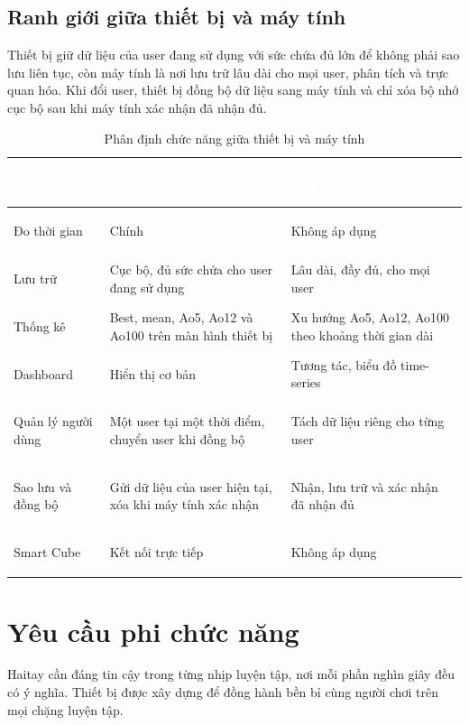 \subsection{Ranh giới giữa thiết bị và máy tính}
Thiết bị giữ dữ liệu của user đang sử dụng với sức chứa đủ lớn để không phải sao lưu liên tục, còn máy tính là nơi lưu trữ lâu dài cho mọi user, phân tích và trực quan hóa. Khi đổi user, thiết bị đồng bộ dữ liệu sang máy tính và chỉ xóa bộ nhớ cục bộ sau khi máy tính xác nhận đã nhận đủ.

\begin{table}[htbp]
    \centering
    \renewcommand{\arraystretch}{1.5}
    \caption{Phân định chức năng giữa thiết bị và máy tính}
    \label{tab:boundary}
    \begin{tabular}{>{\bfseries\raggedright\arraybackslash}m{3.4cm} >{\raggedright\arraybackslash}m{5.2cm} >{\raggedright\arraybackslash}m{5.6cm}}
        \toprule
        \rowcolor{haitayblue}
        \textcolor{white}{Chức năng} & \textcolor{white}{Thiết bị} & \textcolor{white}{Máy tính} \\
        \midrule
        \rowcolor{haitayblue!8}
        Đo thời gian & Chính & Không áp dụng \\
        Lưu trữ & Cục bộ, đủ sức chứa cho user đang sử dụng & Lâu dài, đầy đủ, cho mọi user \\
        \rowcolor{haitayblue!8}
        Thống kê & Best, mean, Ao5, Ao12 và Ao100 trên màn hình thiết bị & Xu hướng Ao5, Ao12, Ao100 theo khoảng thời gian dài \\
        Dashboard & Hiển thị cơ bản & Tương tác, biểu đồ time-series \\
        \rowcolor{haitayblue!8}
        Quản lý người dùng & Một user tại một thời điểm, chuyển user khi đồng bộ & Tách dữ liệu riêng cho từng user \\
        Sao lưu và đồng bộ & Gửi dữ liệu của user hiện tại, xóa khi máy tính xác nhận & Nhận, lưu trữ và xác nhận đã nhận đủ \\
        \rowcolor{haitayblue!8}
        Smart Cube & Kết nối trực tiếp & Không áp dụng \\
        \bottomrule
    \end{tabular}
\end{table}


\section{Yêu cầu phi chức năng}
Haitay cần đáng tin cậy trong từng nhịp luyện tập, nơi mỗi phần nghìn giây đều có ý nghĩa. Thiết bị được xây dựng để đồng hành bền bỉ cùng người chơi trên mọi chặng luyện tập.

